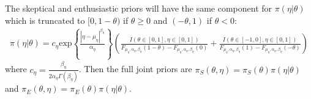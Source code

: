 \documentclass[12pt]{article}
\begin{document}
The skeptical and enthusiastic priors will have the same component for $\pi(\eta|\theta)$ which is truncated to $[0,1-\theta)$ if $\theta\geq 0$ and $(-\theta,1)$ if $\theta < 0$: 
\begin{align*}
\pi(\eta|\theta)=c_\eta\text{exp}\left\{\frac{|\eta-\mu_\eta|^{\beta_\eta}}{\alpha_\eta}\right\}\left(\frac{I(\theta\in[0,1], \eta\in[0,1])}{F_{\mu_\eta,\alpha_\eta,\beta_\eta}(1-\theta)-F_{\mu_\eta,\alpha_\eta,\beta_\eta}(0)}+\frac{I(\theta\in[-1,0], \eta\in[0,1])}{F_{\mu_\eta,\alpha_\eta,\beta_\eta}(1)-F_{\mu_\eta,\alpha_\eta,\beta_\eta}(-\theta)}\right)
\end{align*}
where $c_\eta=\frac{\beta_\eta}{2\alpha_\eta\Gamma(\beta_\eta)}$. Then the full joint priors are $\pi_S(\theta,\eta)=\pi_S(\theta)\pi(\eta|\theta)$ and $\pi_E(\theta,\eta)=\pi_E(\theta)\pi(\eta|\theta)$.



%
%
\end{document}
